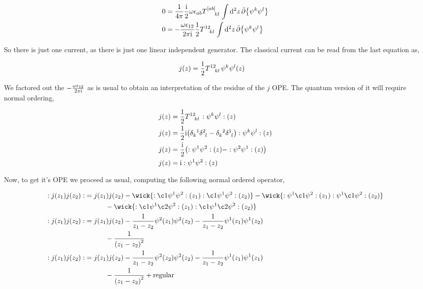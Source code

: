 \begin{align*}
    0&=\frac{1}{4\pi}\frac\im 2\omega\epsilon_{ab}\tensor{T}{^{\qty[ab]}_k_l}\int\dd[2]{z}\bar\partial\qty{\psi^k\psi^l}\\
    0&=-\frac{\omega\epsilon_{12}}{2\pi\im}\frac12\tensor{T}{^{12}_k_l}\int\dd[2]{z}\bar\partial\qty{\psi^k\psi^l}
\end{align*}

So there is just one current, as there is just one linear independent generator. The classical current can be read from the last equation as,

\begin{align*}
    j\qty(z)&=\frac12\tensor{T}{^{12}_k_l}{\psi^k\psi^l}\qty(z)
\end{align*}

We factored out the $-\frac{\omega\epsilon_{12}}{2\pi\textnormal{i}}$ as is usual to obtain an interpretation of the residue of the $j$ OPE. 
The quantum version of it will require normal ordering,

\begin{align*}
    j\qty(z)&=\frac12\tensor{T}{^{12}_k_l}\cnord{\psi^k\psi^l}\qty(z)\\
    j\qty(z)&=\frac12\im\qty(\tensor{\delta}{_k^1}\tensor{\delta}{^2_l}-\tensor{\delta}{_k^2}\tensor{\delta}{^1_l})\cnord{\psi^k\psi^l}\qty(z)\\
    j\qty(z)&=\frac\im2\qty(\cnord{\psi^1\psi^2}\qty(z)-\cnord{\psi^2\psi^1}\qty(z))\\
    j\qty(z)&=\im\cnord{\psi^1\psi^2}\qty(z)
\end{align*}

Now, to get it's OPE we proceed as usual, computing the following normal ordered operator,

\begin{align*}
    \cnord{j\qty(z_1)j\qty(z_2)}&=j\qty(z_1)j\qty(z_2)-\wick{\cnord{\c1\psi^1\psi^2}\qty(z_1)\cnord{\c1\psi^1\psi^2}\qty(z_2)}-\wick{\cnord{\psi^1\c1\psi^2}\qty(z_1)\cnord{\psi^1\c1\psi^2}\qty(z_2)}\\
    &\quad\quad\quad-\wick{\cnord{\c1\psi^1\c2\psi^2}\qty(z_1)\cnord{\c1\psi^1\c2\psi^2}\qty(z_2)}\\
    \cnord{j\qty(z_1)j\qty(z_2)}&=j\qty(z_1)j\qty(z_2)-\frac{1}{z_1-z_2}\psi^2\qty(z_1)\psi^2\qty(z_2)-\frac{1}{z_1-z_2}\psi^1\qty(z_1)\psi^1\qty(z_2)\\
    &\quad\quad\quad-\frac{1}{\qty(z_1-z_2)^2}\\
    \cnord{j\qty(z_1)j\qty(z_2)}&=j\qty(z_1)j\qty(z_2)-\frac{1}{z_1-z_2}\psi^2\qty(z_2)\psi^2\qty(z_2)-\frac{1}{z_1-z_2}\psi^1\qty(z_1)\psi^1\qty(z_1)\\
    &\quad\quad\quad-\frac{1}{\qty(z_1-z_2)^2}+\textnormal{regular}
\end{align*}

